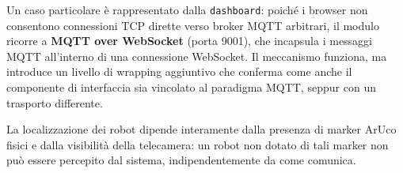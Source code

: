 Un caso particolare è rappresentato dalla \texttt{dashboard}: poiché i browser non consentono connessioni TCP dirette verso broker \ac{MQTT} arbitrari, il modulo ricorre a \textbf{MQTT over WebSocket} (porta 9001), che incapsula i messaggi \ac{MQTT} all'interno di una connessione WebSocket. Il meccanismo funziona, ma introduce un livello di wrapping aggiuntivo che conferma come anche il componente di interfaccia sia vincolato al paradigma \ac{MQTT}, seppur con un trasporto differente.

La localizzazione dei robot dipende interamente dalla presenza di marker ArUco fisici e dalla visibilità della telecamera: un robot non dotato di tali marker non può essere percepito dal sistema, indipendentemente da come comunica.